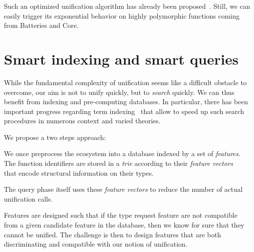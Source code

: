 \documentclass [a4paper,11pt]{scrartcl}
\begin{document}
Such an optimized unification algorithm has already been proposed~\cite {boudet}. Still, we can easily trigger its exponential behavior on highly polymorphic functions coming from Batteries and Core.




\section{Smart indexing and smart queries}

While the fundamental complexity of unification seems like a difficult
obstacle to overcome, our aim is not to unify quickly, but to \emph{search}
quickly. We can thus benefit from indexing and pre-computing databases.
In particular, there has been important progress regarding
term indexing~\cite{schulz,DBLP:books/el/RV01/RamakrishnanSV01} that allow
to speed up such search procedures in numerous context and varied theories.


We propose a two steps approach:
\begin{compactitem}
\item We once preprocess the ecosystem into a database indexed by a set of \emph{features}. The function identifiers are stored in a \textit{trie} according to their \textit{feature vectors}~\cite{schulz} that encode structural information on their types.
\item The query phase itself uses these \emph{feature vectors} to reduce the number of actual unification calls.
\end{compactitem}
Features are designed such that if the type request feature are not compatible
from a given candidate feature in the database, then we know for sure that they cannot be unified.  The challenge is then to design features that are both discriminating and compatible with  our notion of unification. 
\end{document}
